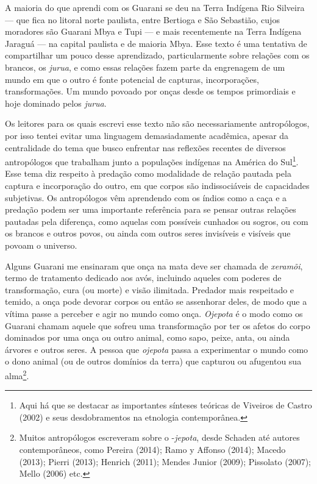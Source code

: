 {A maioria do que aprendi com os Guarani se deu na Terra Indígena Rio
Silveira --- que fica no litoral norte paulista, entre Bertioga e São
Sebastião, cujos moradores são Guarani Mbya e Tupi --- e mais
recentemente na Terra Indígena Jaraguá --- na capital paulista e de
maioria Mbya. Esse texto é uma tentativa de compartilhar um pouco desse
aprendizado, particularmente sobre relações com os brancos, os \emph{jurua}, e
como essas relações fazem parte da engrenagem de um mundo em que o
outro é fonte potencial de capturas, incorporações, transformações. Um
mundo povoado por onças desde os tempos primordiais e hoje dominado
pelos \emph{jurua}. 

Os leitores para os quais escrevi esse texto não são necessariamente
antropólogos, por isso tentei evitar uma linguagem demasiadamente
acadêmica, apesar da centralidade do tema que busco enfrentar nas
reflexões recentes de diversos antropólogos que trabalham junto a
populações indígenas na América do Sul\footnote{Aqui há que se destacar
as importantes sínteses teóricas de Viveiros de Castro (2002) e seus
desdobramentos na etnologia contemporânea.}. Esse tema diz respeito à
predação como modalidade de relação pautada pela captura e incorporação
do outro, em que corpos são indissociáveis de capacidades subjetivas.
Os antropólogos vêm aprendendo com os índios como a caça e a predação
podem ser uma importante referência para se pensar outras relações
pautadas pela diferença, como aquelas com possíveis cunhados ou sogros,
ou com os brancos e outros povos, ou ainda com outros seres invisíveis
e visíveis que povoam o universo.

Alguns Guarani me ensinaram que onça na mata deve ser chamada de
\emph{xeramõi}, termo de tratamento dedicado aos avós, incluindo aqueles com
poderes de transformação, cura (ou morte) e visão ilimitada. Predador
mais respeitado e temido, a onça pode devorar corpos ou então se
assenhorar deles, de modo que a vítima passe a perceber e agir no mundo
como onça. \emph{Ojepota} é o modo como os Guarani chamam aquele que sofreu
uma transformação por ter os afetos do corpo dominados por uma onça ou
outro animal, como sapo, peixe, anta, ou ainda árvores e outros seres.
A pessoa que \emph{ojepota} passa a experimentar o mundo como o dono animal
(ou de outros domínios da terra) que capturou ou afugentou sua
alma\footnote{Muitos antropólogos escreveram sobre o -\emph{jepota}, desde
Schaden até autores contemporâneos, como Pereira (2014); Ramo y Affonso
(2014); Macedo (2013); Pierri (2013); Henrich (2011); Mendes Junior
(2009); Pissolato (2007); Mello (2006) etc.}.

}
